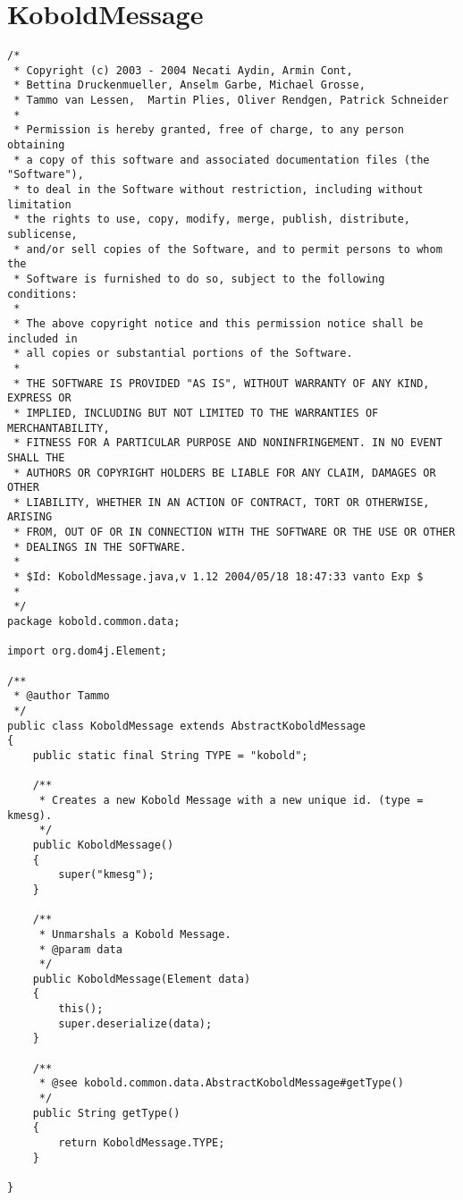 \section{KoboldMessage}
\small \begin{verbatim}
/*
 * Copyright (c) 2003 - 2004 Necati Aydin, Armin Cont, 
 * Bettina Druckenmueller, Anselm Garbe, Michael Grosse, 
 * Tammo van Lessen,  Martin Plies, Oliver Rendgen, Patrick Schneider
 * 
 * Permission is hereby granted, free of charge, to any person obtaining
 * a copy of this software and associated documentation files (the "Software"),
 * to deal in the Software without restriction, including without limitation
 * the rights to use, copy, modify, merge, publish, distribute, sublicense, 
 * and/or sell copies of the Software, and to permit persons to whom the 
 * Software is furnished to do so, subject to the following conditions:
 *
 * The above copyright notice and this permission notice shall be included in 
 * all copies or substantial portions of the Software.
 *
 * THE SOFTWARE IS PROVIDED "AS IS", WITHOUT WARRANTY OF ANY KIND, EXPRESS OR 
 * IMPLIED, INCLUDING BUT NOT LIMITED TO THE WARRANTIES OF MERCHANTABILITY, 
 * FITNESS FOR A PARTICULAR PURPOSE AND NONINFRINGEMENT. IN NO EVENT SHALL THE 
 * AUTHORS OR COPYRIGHT HOLDERS BE LIABLE FOR ANY CLAIM, DAMAGES OR OTHER 
 * LIABILITY, WHETHER IN AN ACTION OF CONTRACT, TORT OR OTHERWISE, ARISING 
 * FROM, OUT OF OR IN CONNECTION WITH THE SOFTWARE OR THE USE OR OTHER 
 * DEALINGS IN THE SOFTWARE.
 *
 * $Id: KoboldMessage.java,v 1.12 2004/05/18 18:47:33 vanto Exp $
 *
 */
package kobold.common.data;

import org.dom4j.Element;

/**
 * @author Tammo
 */
public class KoboldMessage extends AbstractKoboldMessage 
{
    public static final String TYPE = "kobold";
    
	/**
	 * Creates a new Kobold Message with a new unique id. (type = kmesg).
	 */
	public KoboldMessage()
	{
		super("kmesg");
	}

	/**
	 * Unmarshals a Kobold Message.
	 * @param data
	 */
	public KoboldMessage(Element data)
	{
		this();
		super.deserialize(data);
	}

    /**
     * @see kobold.common.data.AbstractKoboldMessage#getType()
     */
    public String getType()
    {
   		return KoboldMessage.TYPE;
    }

}

\end{verbatim}
